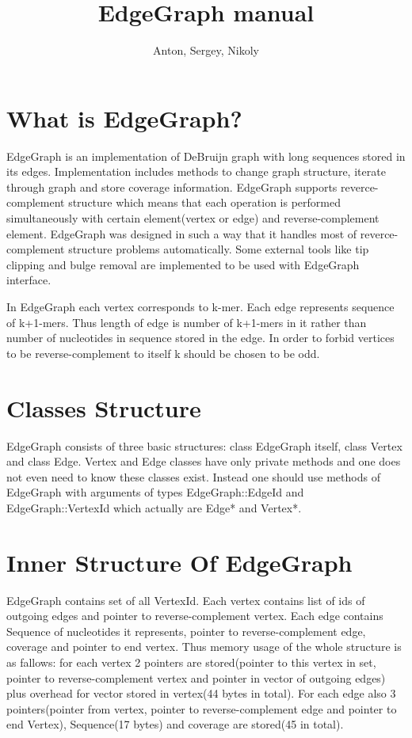 \documentclass[a4paper,10pt]{article}
\title{EdgeGraph manual}
\author{Anton, Sergey, Nikoly}
\begin{document}
\maketitle

\section*{What is EdgeGraph?}
EdgeGraph is an implementation of DeBruijn graph with long sequences stored in its edges. Implementation includes methods to change graph structure, iterate through graph and store coverage information. EdgeGraph supports reverce-complement structure which means that each operation is performed simultaneously with certain element(vertex or edge) and reverse-complement element. EdgeGraph was designed in such a way that it handles most of reverce-complement structure problems automatically. Some external tools like tip clipping and bulge removal are implemented to be used with EdgeGraph interface.

In EdgeGraph each vertex corresponds to k-mer. Each edge represents sequence of k+1-mers. Thus length of edge is number of k+1-mers in it rather than number of nucleotides in sequence stored in the edge. In order to forbid vertices to be reverse-complement to itself k should be chosen to be odd.

\section*{Classes Structure}
EdgeGraph consists of three basic structures: class EdgeGraph itself, class Vertex and class Edge. Vertex and Edge classes have only private methods and one does not even need to know these classes exist. Instead one should use methods of EdgeGraph with arguments of types EdgeGraph::EdgeId and EdgeGraph::VertexId which actually are Edge* and Vertex*.

\section*{Inner Structure Of EdgeGraph}
EdgeGraph contains set of all VertexId. Each vertex contains list of ids of outgoing edges and pointer to reverse-complement vertex.
Each edge contains Sequence of nucleotides it represents, pointer to reverse-complement edge, coverage and pointer to end vertex. Thus memory usage of the whole structure is as fallows: for each vertex 2 pointers are stored(pointer to this vertex in set, pointer to reverse-complement vertex and pointer in vector of outgoing edges) plus overhead for vector stored in vertex(44 bytes in total). For each edge also 3 pointers(pointer from vertex, pointer to reverse-complement edge and pointer to end Vertex), Sequence(17 bytes) and coverage are stored(45 in total). 
\end{document}
